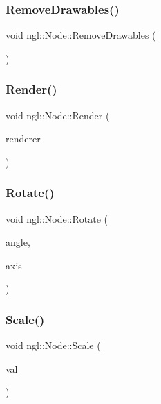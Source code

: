 \subsubsection{\texorpdfstring{Remove\+Drawables()}{RemoveDrawables()}}
{\footnotesize\ttfamily void ngl\+::\+Node\+::\+Remove\+Drawables (\begin{DoxyParamCaption}{ }\end{DoxyParamCaption})}

\mbox{\label{classngl_1_1_node_a2186e08447bb62f8e68ffbab73c97776}} 
\subsubsection{\texorpdfstring{Render()}{Render()}}
{\footnotesize\ttfamily void ngl\+::\+Node\+::\+Render (\begin{DoxyParamCaption}\item[{\mbox{\hyperlink{classngl_1_1_s_g_renderer}{S\+G\+Renderer}} \&}]{renderer }\end{DoxyParamCaption})\hspace{0.3cm}{\ttfamily [virtual]}}

\mbox{\label{classngl_1_1_node_ad5124f13d41ab70817eca9e3f12a8c49}} 
\subsubsection{\texorpdfstring{Rotate()}{Rotate()}}
{\footnotesize\ttfamily void ngl\+::\+Node\+::\+Rotate (\begin{DoxyParamCaption}\item[{const float}]{angle,  }\item[{const glm\+::vec3 \&}]{axis }\end{DoxyParamCaption})}

\mbox{\label{classngl_1_1_node_adde3d3a0d6dcd5f9a161898c2554af36}} 
\subsubsection{\texorpdfstring{Scale()}{Scale()}}
{\footnotesize\ttfamily void ngl\+::\+Node\+::\+Scale (\begin{DoxyParamCaption}\item[{const glm\+::vec3 \&}]{val }\end{DoxyParamCaption})}

